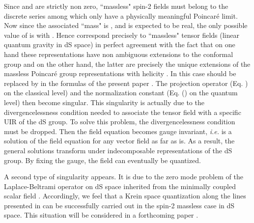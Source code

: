 \documentclass[a4paper,11pt,showpacs,preprintnumbers]{revtex4}
\begin{document}
 Since  \coordHE{} and
\coordHE{} are strictly  non zero, ``massless" spin-2 fields must
belong to the discrete series among which only \coordHE{}
have a physically meaningful Poincar\'e limit. Now since the
associated ``mass" is \coordHE{},
and is expected to be real, the only possible value of \coordHE{} is \coordHE{}
with \coordHE{}. Hence \coordHE{} correspond precisely to
``massless" tensor fields (linear quantum gravity in dS space) in
perfect agreement with the fact that on  one hand these
representations have non ambiguous extensions to the conformal
group \coordHE{} and on the other hand, the latter are precisely
the unique extensions of the massless Poincar\'e group
representations with helicity \coordHE{}. In this case \myHighlight{$\nu $}\coordHE{} should
be replaced by \coordHE{} in the formulas of the present
paper \cite{ta}. The projection operator \coordHE{} (Eq.
\myHighlight{$(\ref{eq:pro}$}\coordHE{}) on the classical level) and the normalization
constant \coordHE{} (Eq. (\myHighlight{$\ref{eq:nor}$}\coordHE{}) on the quantum level)
then become singular. This singularity is actually due to the
divergencelessness condition needed to associate the tensor field
with a specific UIR of the dS group. To solve this problem, the
divergencelessness condition must be dropped. Then the field
equation becomes gauge invariant, {\it i.e.} \coordHE{} is a solution of the field equation for any
vector field \coordHE{} as far as \coordHE{} is. As a result, the
general solutions transform under  indecomposable representations
of the dS group. By fixing the gauge, the field can  eventually be
quantized.

A second type of singularity appears. It is due to the zero mode
problem of the Laplace-Beltrami operator on dS space inherited
from  the minimally coupled scalar field \cite{gareta1}.
Accordingly, we feel that a Krein space quantization along the
lines presented in
  \cite{gareta1} can be successfully
carried out in the spin-2 massless case in dS space. This
situation will be considered in a forthcoming paper
\cite{gareta2}.

\vspace{0.5cm}
\end{document}
